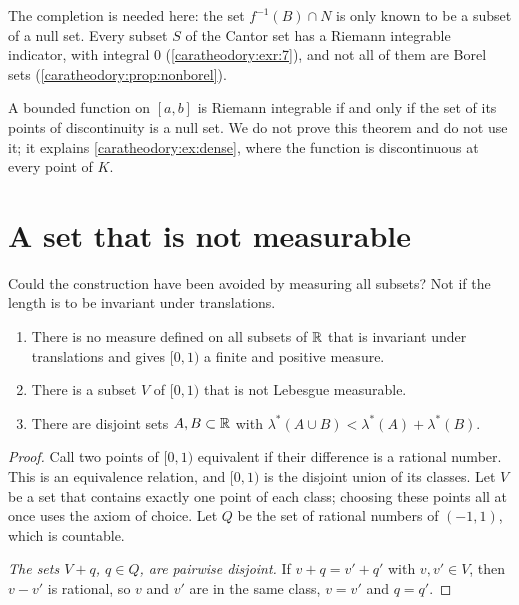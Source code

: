 \begin{notechapter}
The completion is needed here: the set $f^{-1}(B)\cap N$ is only known
to be a subset of a null set. Every subset $S$ of the Cantor set has a
Riemann integrable indicator, with integral $0$
(\cref{caratheodory:exr:7}), and not all of them are Borel sets
(\cref{caratheodory:prop:nonborel}).

\begin{remark}\label{caratheodory:rem:criterion}
A bounded function on $[a, b]$ is Riemann integrable if and only if
the set of its points of discontinuity is a null set. We do not prove
this theorem and do not use it; it explains
\cref{caratheodory:ex:dense}, where the function is discontinuous at
every point of $K$.
\end{remark}

\section{A set that is not measurable}\label{caratheodory:sec:vitali}

Could the construction have been avoided by measuring all subsets? Not
if the length is to be invariant under translations.

\begin{theorem}[Vitali]\label{caratheodory:thm:vitali}
\begin{enumerate}[nosep]
  \item There is no measure defined on all subsets of $\mathbb{R}$ that is
        invariant under translations and gives $[0, 1)$ a finite and
        positive measure.
  \item There is a subset $V$ of $[0, 1)$ that is not Lebesgue
        measurable.
  \item There are disjoint sets $A, B\subset\mathbb{R}$ with
        $\lambda^*(A\cup B) < \lambda^*(A) + \lambda^*(B)$.
\end{enumerate}
\end{theorem}

\begin{proof}
Call two points of $[0, 1)$ equivalent if their difference is a
rational number. This is an equivalence relation, and $[0, 1)$ is the
disjoint union of its classes. Let $V$ be a set that contains exactly
one point of each class; choosing these points all at once uses the
axiom of choice. Let $Q$ be the set of rational numbers of $(-1, 1)$,
which is countable.

\emph{The sets $V + q$, $q\in Q$, are pairwise disjoint.} If
$v + q = v' + q'$ with $v, v'\in V$, then $v - v'$ is rational, so
$v$ and $v'$ are in the same class, $v = v'$ and $q = q'$.


\end{proof}
\end{notechapter}

